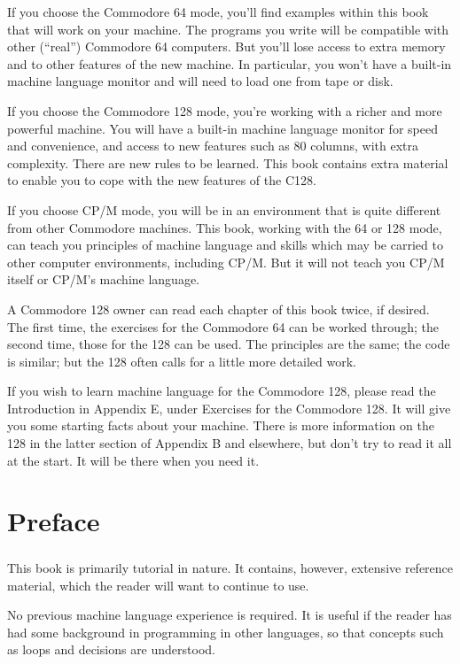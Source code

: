 \documentclass[11pt,a4paper,titlepage]{memoir}
\begin{document}
If you choose the Commodore 64 mode, you'll find examples within this book that will work on your machine. The programs you write will be compatible with other (``real'') Commodore 64 computers. But you'll lose access to extra memory and to other features of the new machine. In particular, you won't have a built-in machine language monitor and will need to load one from tape or disk.

If you choose the Commodore 128 mode, you're working with a richer and more powerful machine. You will have a built-in machine language monitor for speed and convenience, and access to new features such as 80 columns, with extra complexity. There are new rules to be learned. This book contains extra material to enable you to cope with the new features of the C128.

If you choose CP/M mode, you will be in an environment that is quite different from other Commodore machines. This book, working with the 64 or 128 mode, can teach you principles of machine language and skills which may be carried to other computer environments, including CP/M. But it will not teach you CP/M itself or CP/M's machine language.

A Commodore 128 owner can read each chapter of this book twice, if desired. The first time, the exercises for the Commodore 64 can be worked through; the second time, those for the 128 can be used. The principles are the same; the code is similar; but the 128 often calls for a little more detailed work.

If you wish to learn machine language for the Commodore 128, please read the Introduction in Appendix E, under Exercises for the Commodore 128. It will give you some starting facts about your machine. There is more information on the 128 in the latter section of Appendix B and elsewhere, but don't try to read it all at the start. It will be there when you need it.
\chapter{Preface}
\paragraph{}
This book is primarily tutorial in nature. It contains, however, extensive reference material, which the reader will want to continue to use.

No previous machine language experience is required. It is useful if the reader has had some background in programming in other languages, so that concepts such as loops and decisions are understood.
\end{document}
